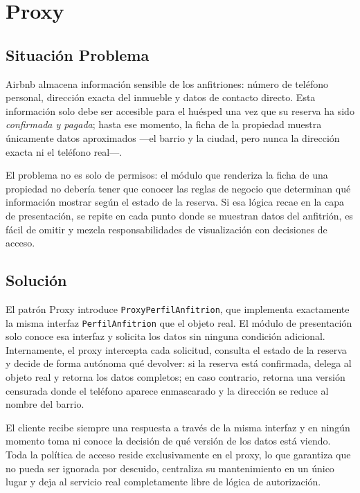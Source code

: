
\chapter{Proxy}

\section{Situación Problema}

Airbnb almacena información sensible de los anfitriones: número de
teléfono personal, dirección exacta del inmueble y datos de contacto
directo. Esta información solo debe ser accesible para el huésped una
vez que su reserva ha sido \emph{confirmada y pagada}; hasta ese momento,
la ficha de la propiedad muestra únicamente datos aproximados ---el
barrio y la ciudad, pero nunca la dirección exacta ni el teléfono real---.

El problema no es solo de permisos: el módulo que renderiza la ficha
de una propiedad no debería tener que conocer las reglas de negocio
que determinan qué información mostrar según el estado de la reserva.
Si esa lógica recae en la capa de presentación, se repite en cada punto
donde se muestran datos del anfitrión, es fácil de omitir y mezcla
responsabilidades de visualización con decisiones de acceso.

\section{Solución}

El patrón Proxy introduce \texttt{ProxyPerfilAnfitrion}, que implementa
exactamente la misma interfaz \texttt{PerfilAnfitrion} que el objeto
real. El módulo de presentación solo conoce esa interfaz y solicita
los datos sin ninguna condición adicional. Internamente, el proxy
intercepta cada solicitud, consulta el estado de la reserva y decide
de forma autónoma qué devolver: si la reserva está confirmada, delega
al objeto real y retorna los datos completos; en caso contrario, retorna
una versión censurada donde el teléfono aparece enmascarado y la
dirección se reduce al nombre del barrio.

El cliente recibe siempre una respuesta a través de la misma interfaz
y en ningún momento toma ni conoce la decisión de qué versión de los
datos está viendo. Toda la política de acceso reside exclusivamente en
el proxy, lo que garantiza que no pueda ser ignorada por descuido,
centraliza su mantenimiento en un único lugar y deja al servicio real
completamente libre de lógica de autorización.

